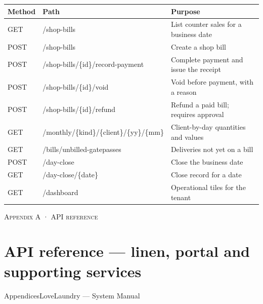 \documentclass[11pt,a4paper,oneside]{book}
\begin{document}
\begin{center}\small
\begin{tabularx}{\linewidth}{|X|X|X|}
\hline
\rowcolor{lightgrey}
\textbf{Method} & \textbf{Path} & \textbf{Purpose} \\ \hline
GET & /shop-bills & List counter sales for a business date \\ \hline
POST & /shop-bills & Create a shop bill \\ \hline
POST & /shop-bills/\{id\}/record-payment & Complete payment and issue the receipt \\ \hline
POST & /shop-bills/\{id\}/void & Void before payment, with a reason \\ \hline
POST & /shop-bills/\{id\}/refund & Refund a paid bill; requires approval \\ \hline
GET & /monthly/\{kind\}/\{client\}/\{yy\}/\{mm\} & Client-by-day quantities and values \\ \hline
GET & /bills/unbilled-gatepasses & Deliveries not yet on a bill \\ \hline
POST & /day-close & Close the business date \\ \hline
GET & /day-close/\{date\} & Close record for a date \\ \hline
GET & /dashboard & Operational tiles for the tenant \\ \hline
\end{tabularx}
\end{center}
\textsc{\small\color{crimson}Appendix A · API reference}\par\medskip
\section*{API reference — linen, portal and supporting services}
AppendicesLoveLaundry — System Manual
\end{document}
